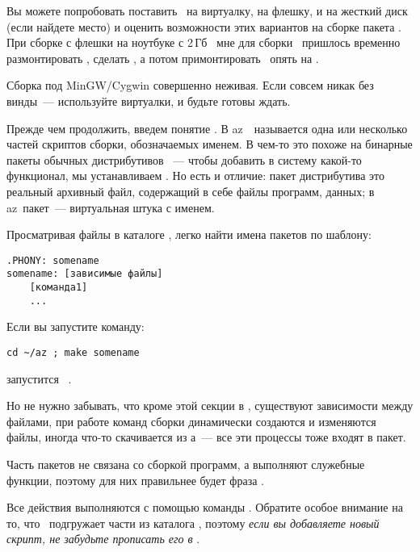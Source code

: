 Вы можете попробовать поставить \linux\ на виртуалку, на флешку, и на жесткий
диск (если найдете место) и оценить возможности этих вариантов на сборке пакета
. При сборке с флешки на ноутбуке с 2\,Гб \ram\ мне для сборки
\ пришлось временно размонтировать , сделать
, а потом примонтировать \
опять на .

Сборка под MinGW/Cygwin совершенно неживая. Если совсем никак без винды\ ---
используйте виртуалки, и будьте готовы ждать.


Прежде чем продолжить, введем понятие . В az\linux\
\ называется одна или несколько частей скриптов сборки,
обозначаемых именем. В чем-то это похоже на бинарные пакеты обычных
дистрибутивов \linux\ --- чтобы добавить в систему какой-то функционал, мы
устанавливаем \term{бинарный пакет}.
Но есть и отличие: пакет дистрибутива это реальный архивный файл, содержащий в
себе файлы программ, данных; в az\linux\ пакет\ --- виртуальная штука с именем.

Просматривая файлы в каталоге \file{mk/}, легко найти имена пакетов по шаблону:

\begin{verbatim}
.PHONY: somename
somename: [зависимые файлы]
    [команда1]
    ...
\end{verbatim}

Если вы запустите команду:

\begin{verbatim}
cd ~/az ; make somename
\end{verbatim}

запустится \ .

Но не нужно забывать, что кроме этой секции в \file{.mk}, существуют зависимости
между файлами, при работе команд сборки динамически создаются и изменяются
файлы, иногда что-то скачивается из \internet а\ --- все эти процессы тоже
входят в пакет.

\bigskip
Часть пакетов не связана со сборкой программ, а выполняют служебные функции,
поэтому для них правильнее будет фраза .

\bigskip
Все действия выполняются с помощью команды . Обратите особое внимание
на то, что \ подгружает части из каталога , поэтому
\emph{если вы добавляете новый скрипт, не забудьте прописать его в
\file{Makefile}}.

